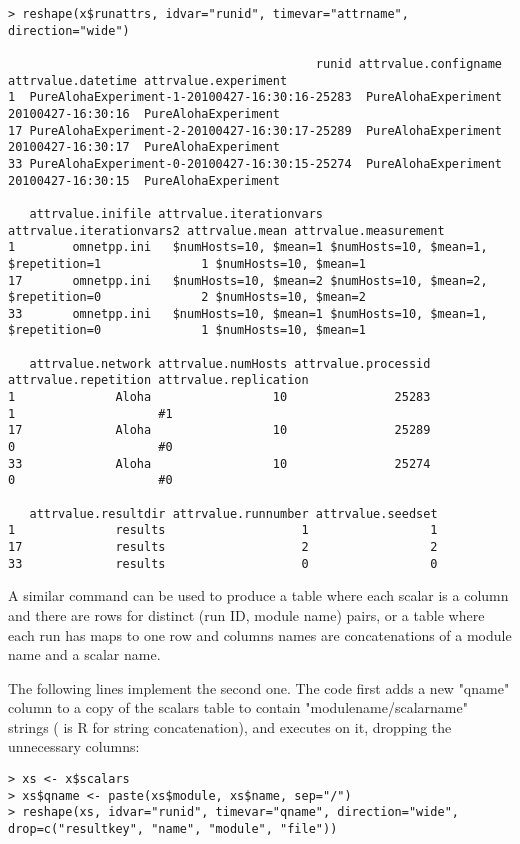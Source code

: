 \begin{verbatim}
> reshape(x$runattrs, idvar="runid", timevar="attrname", direction="wide")

                                           runid attrvalue.configname attrvalue.datetime attrvalue.experiment
1  PureAlohaExperiment-1-20100427-16:30:16-25283  PureAlohaExperiment  20100427-16:30:16  PureAlohaExperiment
17 PureAlohaExperiment-2-20100427-16:30:17-25289  PureAlohaExperiment  20100427-16:30:17  PureAlohaExperiment
33 PureAlohaExperiment-0-20100427-16:30:15-25274  PureAlohaExperiment  20100427-16:30:15  PureAlohaExperiment

   attrvalue.inifile attrvalue.iterationvars             attrvalue.iterationvars2 attrvalue.mean attrvalue.measurement
1        omnetpp.ini   $numHosts=10, $mean=1 $numHosts=10, $mean=1, $repetition=1              1 $numHosts=10, $mean=1
17       omnetpp.ini   $numHosts=10, $mean=2 $numHosts=10, $mean=2, $repetition=0              2 $numHosts=10, $mean=2
33       omnetpp.ini   $numHosts=10, $mean=1 $numHosts=10, $mean=1, $repetition=0              1 $numHosts=10, $mean=1

   attrvalue.network attrvalue.numHosts attrvalue.processid attrvalue.repetition attrvalue.replication
1              Aloha                 10               25283                    1                    #1
17             Aloha                 10               25289                    0                    #0
33             Aloha                 10               25274                    0                    #0

   attrvalue.resultdir attrvalue.runnumber attrvalue.seedset
1              results                   1                 1
17             results                   2                 2
33             results                   0                 0
\end{verbatim}

A similar command can be used to produce a table where each scalar is a column
and there are rows for distinct (run ID, module name) pairs, or a table where
each run has maps to one row and columns names are concatenations of a module name
and a scalar name.

The following lines implement the second one. The code first adds a new "qname"
column to a copy of the scalars table to contain "modulename/scalarname" strings
( is R for string concatenation), and executes  on it,
dropping the unnecessary columns:

\begin{verbatim}
> xs <- x$scalars
> xs$qname <- paste(xs$module, xs$name, sep="/")
> reshape(xs, idvar="runid", timevar="qname", direction="wide", drop=c("resultkey", "name", "module", "file"))
\end{verbatim}


